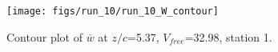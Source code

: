 \begin{figure}[H]
\centering
\texttt{[image: figs/run\_10/run\_10\_W\_contour]}
\caption{Contour plot of $\overline{w}$ at $z/c$=5.37, $V_{free}$=32.98, station 1.}
\label{fig:run_10_W_contour}
\end{figure}


